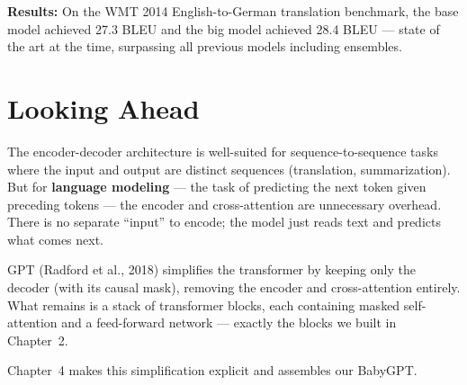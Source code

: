 \textbf{Results:} On the WMT 2014 English-to-German translation benchmark, the base model achieved 27.3 BLEU and the big model achieved 28.4 BLEU --- state of the art at the time, surpassing all previous models including ensembles.

\section{Looking Ahead}

The encoder-decoder architecture is well-suited for sequence-to-sequence tasks where the input and output are distinct sequences (translation, summarization). But for \textbf{language modeling} --- the task of predicting the next token given preceding tokens --- the encoder and cross-attention are unnecessary overhead. There is no separate ``input'' to encode; the model just reads text and predicts what comes next.

GPT (Radford et al., 2018) simplifies the transformer by keeping only the decoder (with its causal mask), removing the encoder and cross-attention entirely. What remains is a stack of transformer blocks, each containing masked self-attention and a feed-forward network --- exactly the blocks we built in Chapter~2.

Chapter~4 makes this simplification explicit and assembles our BabyGPT.
